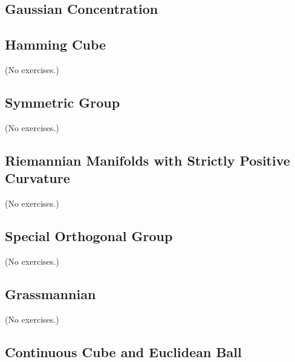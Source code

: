 \documentclass{report}
\theoremstyle{definition}
\newenvironment{exercise}[1]{
  \renewcommand\theexerciseimpl{#1}
  \exerciseimpl
}{\endexerciseimpl}
\begin{document}
\subsection{Gaussian Concentration}

\begin{exercise}{5.2.3}
\end{exercise}

\begin{exercise}{5.2.4}
\end{exercise}

\subsection{Hamming Cube}

(No exercises.)

\subsection{Symmetric Group}

(No exercises.)

\subsection{Riemannian Manifolds with Strictly Positive Curvature}

(No exercises.)

\subsection{Special Orthogonal Group}

(No exercises.)

\subsection{Grassmannian}

(No exercises.)

\subsection{Continuous Cube and Euclidean Ball}

\begin{exercise}{5.2.11}
\end{exercise}

\begin{exercise}{5.2.12}
\end{exercise}
\end{document}
